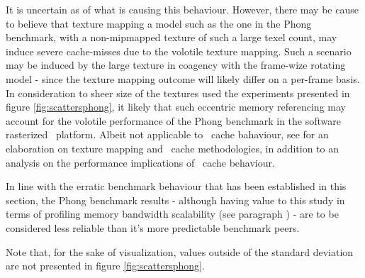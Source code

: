 It is uncertain as of what is causing this behaviour.
However, there may be cause to believe that texture mapping a model such as the one in the Phong benchmark, with a non-mipmapped texture of such a large texel count, may induce severe cache-misses due to the volotile texture mapping.
Such a scenario may be induced by the large texture in coagency with the frame-wize rotating model - since the texture mapping outcome will likely differ on a per-frame basis.
In consideration to sheer size of the textures used the experiments presented in figure \ref{fig:scattersphong}, it likely that such eccentric memory referencing may account for the volotile performance of the Phong benchmark in the software rasterized \dvttermsimics\ platform.
Albeit not applicable to \dvttermcpu\ cache bahaviour, see  for an elaboration on texture mapping and \dvttermgpu\ cache methodologies, in addition to an analysis on the performance implications of \dvttermgpu\ cache behaviour.

In line with the erratic benchmark behaviour that has been established in this section, the Phong benchmark results - although having value to this study in terms of profiling memory bandwidth scalability (see paragraph ) - are to be considered less reliable than it's more predictable benchmark peers.

\noindent
Note that, for the sake of visualization, values outside of the standard deviation are not presented in figure \ref{fig:scattersphong}.





